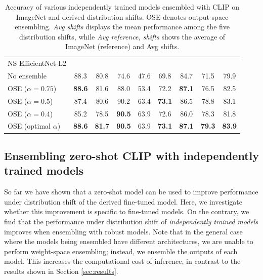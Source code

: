 \begin{table}
\begin{center}
\begin{tabular}{lc|ccccc|cc}
NS EfficientNet-L2   &            &  & & & &  &  & \\
\quad No ensemble      &           88.3 &           80.8 &           74.6 &           47.6 &           69.8 &           84.7 &           71.5 &           79.9 \\  
\quad OSE ($\alpha{=}0.75$)  &  \textbf{88.6} &           81.6 &           88.0 &           53.4 &           72.2 &  \textbf{87.1} &           76.5 &           82.5 \\                
\quad OSE ($\alpha{=}0.5$)   &           87.4 &           80.6 &           90.2 &           63.4 &  \textbf{73.1} &           86.5 &           78.8 &           83.1 \\                
\quad OSE ($\alpha{=}0.4$)   &           85.2 &           78.5 &  \textbf{90.5} &           63.9 &           72.6 &           86.0 &           78.3 &           81.8 \\                
\quad OSE (optimal $\alpha$) &  \textbf{88.6} &  \textbf{81.7} &  \textbf{90.5} &           63.9 &  \textbf{73.1} &  \textbf{87.1} &  \textbf{79.3} &  \textbf{83.9} \\ 


\bottomrule
\end{tabular}
\caption{\label{tab:beyond}
Accuracy of various independently trained models ensembled with CLIP on ImageNet and derived distribution shifts. OSE denotes output-space ensembling.  \textit{Avg shifts} displays the mean performance among the five distribution shifts, while \textit{Avg reference, shifts} shows the average of ImageNet (reference) and Avg shifts.
}
\end{center}
\end{table}


\subsection{Ensembling zero-shot CLIP with independently trained models}
\label{sec:beyond}


So far we have shown that a zero-shot model can be used to improve performance under distribution shift of the derived fine-tuned model. 
Here, we investigate whether this improvement is specific to fine-tuned models. On the contrary, we find that the performance under distribution shift of \textit{independently trained models} improves when ensembling with robust models. Note that in the general case where the models being ensembled have different architectures, we are unable to perform weight-space ensembling;
instead, we ensemble the outputs of each model. This increases the computational cost of inference, in contrast to the results shown in Section \ref{sec:results}.

